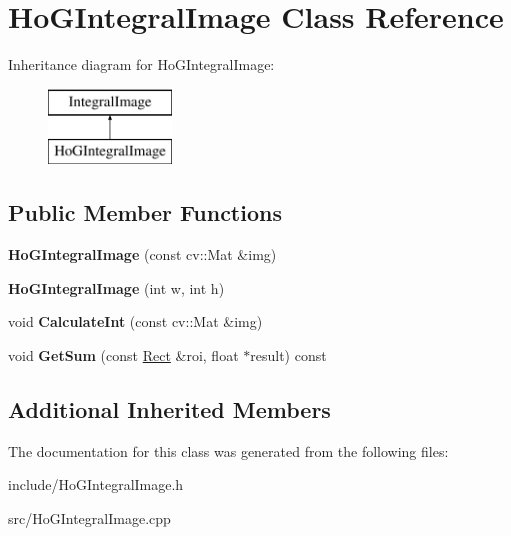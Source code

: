\hypertarget{classHoGIntegralImage}{}\section{Ho\+G\+Integral\+Image Class Reference}
\label{classHoGIntegralImage}
Inheritance diagram for Ho\+G\+Integral\+Image\+:\begin{figure}[H]
\begin{center}
\leavevmode
\includegraphics[height=2.000000cm]{classHoGIntegralImage}
\end{center}
\end{figure}
\subsection*{Public Member Functions}
\begin{DoxyCompactItemize}
\item 
\hypertarget{classHoGIntegralImage_a3005a86adb82824baa52194dc7263e04}{}{\bfseries Ho\+G\+Integral\+Image} (const cv\+::\+Mat \&img)\label{classHoGIntegralImage_a3005a86adb82824baa52194dc7263e04}

\item 
\hypertarget{classHoGIntegralImage_a8f177c758e21a588d4f872f7f7ebcb44}{}{\bfseries Ho\+G\+Integral\+Image} (int w, int h)\label{classHoGIntegralImage_a8f177c758e21a588d4f872f7f7ebcb44}

\item 
\hypertarget{classHoGIntegralImage_aede37af7488a0b63b9516dab670fdee5}{}void {\bfseries Calculate\+Int} (const cv\+::\+Mat \&img)\label{classHoGIntegralImage_aede37af7488a0b63b9516dab670fdee5}

\item 
\hypertarget{classHoGIntegralImage_a57eef64a949491e3cb9a3e37d4710e11}{}void {\bfseries Get\+Sum} (const \hyperlink{classRect}{Rect} \&roi, float $\ast$result) const \label{classHoGIntegralImage_a57eef64a949491e3cb9a3e37d4710e11}

\end{DoxyCompactItemize}
\subsection*{Additional Inherited Members}


The documentation for this class was generated from the following files\+:\begin{DoxyCompactItemize}
\item 
include/Ho\+G\+Integral\+Image.\+h\item 
src/Ho\+G\+Integral\+Image.\+cpp\end{DoxyCompactItemize}
